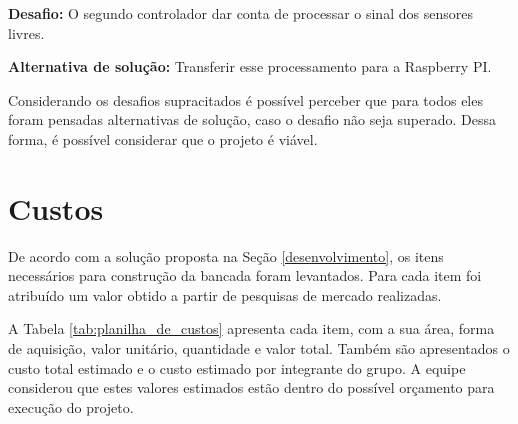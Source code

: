 \textbf{Desafio:}
 O segundo controlador  dar conta de processar o sinal dos sensores livres.
 
\textbf{Alternativa de solução:}
Transferir esse processamento para a Raspberry PI.

Considerando os desafios supracitados é possível perceber que para todos eles foram pensadas alternativas de solução, caso o desafio não seja superado. Dessa forma, é possível considerar que o projeto é viável. 

\section{Custos}

De acordo com a solução proposta na Seção \ref{desenvolvimento}, os itens necessários para construção da bancada foram levantados. Para cada item foi atribuído um valor obtido a partir de pesquisas de mercado realizadas. 

A Tabela \ref{tab:planilha_de_custos} apresenta
cada item, com a sua área, forma de aquisição, valor unitário, quantidade e valor total. Também são apresentados o custo total estimado e o custo estimado por integrante do grupo. A equipe considerou que estes valores estimados estão dentro do possível orçamento para execução do projeto. 

